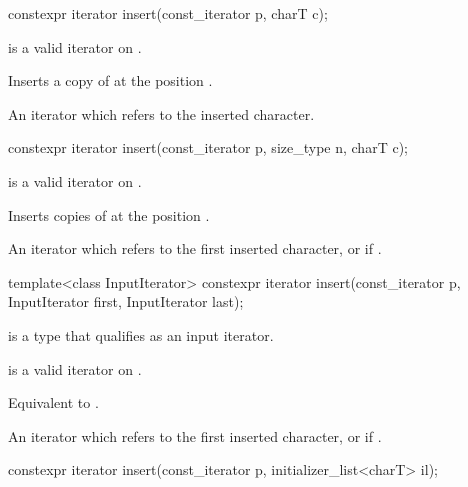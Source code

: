 %
\begin{itemdecl}
constexpr iterator insert(const_iterator p, charT c);
\end{itemdecl}

\begin{itemdescr}
\pnum
\expects
{} is a valid iterator on
.

\pnum
\effects
Inserts a copy of  at the position .

\pnum
\returns
An iterator which refers to the inserted character.
\end{itemdescr}

%
\begin{itemdecl}
constexpr iterator insert(const_iterator p, size_type n, charT c);
\end{itemdecl}

\begin{itemdescr}
\pnum
\expects
{} is a valid iterator on
.

\pnum
\effects
Inserts  copies of  at the position .

\pnum
\returns
An iterator which refers to  the first inserted character, or
 if .
\end{itemdescr}

%
\begin{itemdecl}
template<class InputIterator>
  constexpr iterator insert(const_iterator p, InputIterator first, InputIterator last);
\end{itemdecl}

\begin{itemdescr}
\pnum
\constraints
{} is a type that qualifies as an input
iterator.

\pnum
\expects
{} is a valid iterator on
.

\pnum
\effects
Equivalent to
.

\pnum
\returns
An iterator which refers to the first inserted character, or
 if .
\end{itemdescr}

%
\begin{itemdecl}
constexpr iterator insert(const_iterator p, initializer_list<charT> il);
\end{itemdecl}

